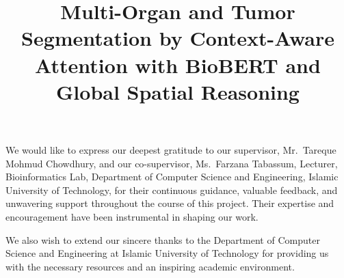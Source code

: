 \documentclass{cls/iutbscthesis}
\title{Multi-Organ and Tumor Segmentation by Context-Aware Attention with BioBERT and Global Spatial Reasoning}
\begin{document}

\coverpage


\titlepage

\declarationofcandidate


\tableofcontents
\listoffigures

\clearpage

\begin{abbreviations}
\end{abbreviations}

\begin{acknowledgement}

We would like to express our deepest gratitude to our supervisor, Mr.\ Tareque Mohmud Chowdhury, and our co-supervisor, Ms.\ Farzana Tabassum, Lecturer, Bioinformatics Lab, Department of Computer Science and Engineering, Islamic University of Technology, for their continuous guidance, valuable feedback, and unwavering support throughout the course of this project. Their expertise and encouragement have been instrumental in shaping our work.

We also wish to extend our sincere thanks to the Department of Computer Science and Engineering at Islamic University of Technology for providing us with the necessary resources and an inspiring academic environment.

\end{acknowledgement}
\end{document}
